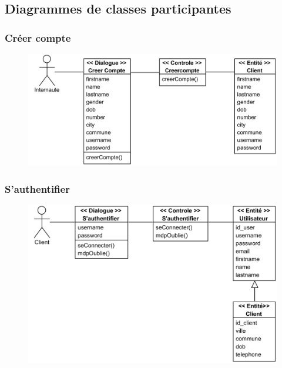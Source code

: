     \subsection[Diagrammes de classes participantes]{Diagrammes de classes participantes}
        \subsubsection[Créer compte]{Créer compte}
            \begin{figure}[H]
                \centering
                \includegraphics[width=130mm]{images/diagrammes-de-classes-participantes/creer-compte Class Diagram.png}
                \label{fig:cpCreerCpt}
            \end{figure}
        \subsubsection[S’authentifier]{S’authentifier}
            \begin{figure}[H]
                \centering
                \includegraphics[width=130mm]{images/diagrammes-de-classes-participantes/authentifier Class Diagram.png}
                \label{fig:cpSauth}
            \end{figure}

